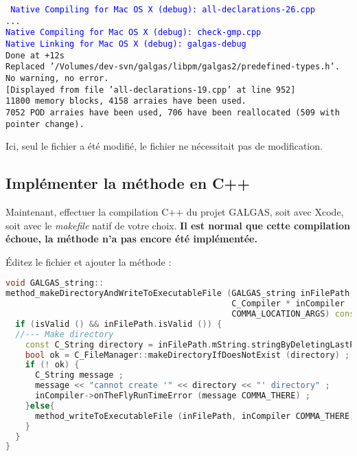 \begin{mdframed}[hidealllines=true,backgroundcolor=gray!10] \tt\small
\textcolor{blue}{Native Compiling for Mac OS X (debug): all-declarations-26.cpp}\\
...\\
\textcolor{blue}{Native Compiling for Mac OS X (debug): check-gmp.cpp}\\
\textcolor{blue}{Native Linking for Mac OS X (debug): galgas-debug}\\
Done at +12s\\
\textcolor{OliveGreen}{Replaced '/Volumes/dev-svn/galgas/libpm/galgas2/predefined-types.h'.}\\
No warning, no error.\\
\verb![!Displayed from file 'all-declarations-19.cpp' at line 952\verb!]!\\
11800 memory blocks, 4158 arraies have been used.\\
7052 POD arraies have been used, 706 have been reallocated (509 with pointer change).
\end{mdframed}

Ici, seul le fichier  a été modifié, le fichier  ne nécessitait pas de modification.



\subsection{Implémenter la méthode en C++}

Maintenant, effectuer la compilation C++ du projet GALGAS, soit avec Xcode, soit avec le \emph{makefile} natif de votre choix. {\bf Il est normal
que cette compilation échoue, la méthode n'a pas encore été implémentée.}

Éditez le fichier  et ajouter la méthode :

\begin{lstlisting}[language=C++]
void GALGAS_string::
method_makeDirectoryAndWriteToExecutableFile (GALGAS_string inFilePath,
                                              C_Compiler * inCompiler
                                              COMMA_LOCATION_ARGS) const {
  if (isValid () && inFilePath.isValid ()) {
  //--- Make directory
    const C_String directory = inFilePath.mString.stringByDeletingLastPathComponent () ;
    bool ok = C_FileManager::makeDirectoryIfDoesNotExist (directory) ;
    if (! ok) {
      C_String message ;
      message << "cannot create '" << directory << "' directory" ;
      inCompiler->onTheFlyRunTimeError (message COMMA_THERE) ;
    }else{
      method_writeToExecutableFile (inFilePath, inCompiler COMMA_THERE) ;
    }
  }
}
\end{lstlisting}

